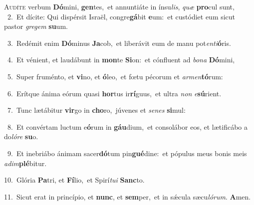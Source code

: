 \lettrine{\initial\textcolor{\initialcolor}{A}}{udíte} verbum \textbf{Dó}\-mini, \textbf{gen}\-tes,~\star et annuntiáte in ínsu\-\textit{lis}\-, \textit{quæ} \textbf{pro}\-cul sunt,\\
{\numbfont\textcolor{\numbcolor}{~2.}}~Et dícite: Qui dispérsit Israël, congre\-\textbf{gá}\-bit \textbf{e}\-um:~\star et custódiet eum sicut pastor \textit{gre}\-\textit{gem} \textbf{su}\-um.\par
{\numbfont\textcolor{\numbcolor}{~3.}}~Redémit enim \textbf{Dó}\-minus \textbf{Ja}\-cob,~\star et liberávit eum de manu pot\-\textit{en}\-\textit{ti}\textbf{ó}ris.\par
{\numbfont\textcolor{\numbcolor}{~4.}}~Et vénient, et laudábunt in \textbf{mon}\-te \textbf{Si}\-on:~\star et cónfluent ad \textit{bo}\-\textit{na} \textbf{Dó}\-mini,\par
{\numbfont\textcolor{\numbcolor}{~5.}}~Super fruménto, et \textbf{vi}\-no, et \textbf{ó}\-leo,~\star et fœtu pécorum et \textit{ar}\-\textit{men}\textbf{tó}rum:\par
{\numbfont\textcolor{\numbcolor}{~6.}}~Erítque ánima eórum quasi \textbf{hor}\-tus ir\-\textbf{rí}\-guus,~\star et ultra \textit{non} \textit{e}\-\textbf{sú}rient.\par
{\numbfont\textcolor{\numbcolor}{~7.}}~Tunc lætábitur \textbf{vir}\-go in \textbf{cho}\-ro,~\star júvenes et \textit{se}\-\textit{nes} \textbf{si}\-mul:\par
{\numbfont\textcolor{\numbcolor}{~8.}}~Et convértam luctum e\-\textbf{ó}\-rum in \textbf{gáu}\-dium,~\star et consolábor eos, et lætificábo a do\-\textit{ló}\-\textit{re} \textbf{su}\-o.\par
{\numbfont\textcolor{\numbcolor}{~9.}}~Et inebriábo ánimam sacer\-\textbf{dó}\-tum pin\-\textbf{gué}\-dine:~\star et pópulus meus bonis meis \textit{ad}\-\textit{im}\textbf{plé}bitur.\par
{\numbfont\textcolor{\numbcolor}{10.}}~Glória \textbf{Pa}\-tri, et \textbf{Fí}\-lio,~\star et Spirí\-\textit{tu}\-\textit{i} \textbf{Sanc}\-to.\par
{\numbfont\textcolor{\numbcolor}{11.}}~Sicut erat in princípio, et \textbf{nunc}\-, et \textbf{sem}\-per,~\star et in sǽcula sæcu\-\textit{ló}\-\textit{rum}. \textbf{A}\-men.\par
